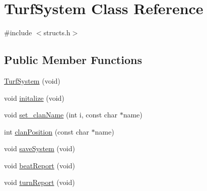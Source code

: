 \hypertarget{classTurfSystem}{\section{Turf\-System Class Reference}
\label{classTurfSystem}
}


{\ttfamily \#include $<$structs.\-h$>$}

\subsection*{Public Member Functions}
\begin{DoxyCompactItemize}
\item 
\hyperlink{classTurfSystem_a3e827914ebf7414a6ff27c0371e33700}{Turf\-System} (void)
\item 
void \hyperlink{classTurfSystem_af3977efc93b3e570b8b97a1aa6adb3e4}{initalize} (void)
\item 
void \hyperlink{classTurfSystem_ace8f70946b1af7935824a2ba0d0b86d7}{set\-\_\-clan\-Name} (int i, const char $\ast$name)
\item 
int \hyperlink{classTurfSystem_adc1d992b8e40303531d08c65d0ea7ea6}{clan\-Position} (const char $\ast$name)
\item 
void \hyperlink{classTurfSystem_a3abfed2c71441d5d63cb57a23ef0956c}{save\-System} (void)
\item 
void \hyperlink{classTurfSystem_a8f881654e02c9224834ec040300f5256}{beat\-Report} (void)
\item 
void \hyperlink{classTurfSystem_a734bb47ddd51a3376b48d18d88d4514b}{turn\-Report} (void)
\end{DoxyCompactItemize}
